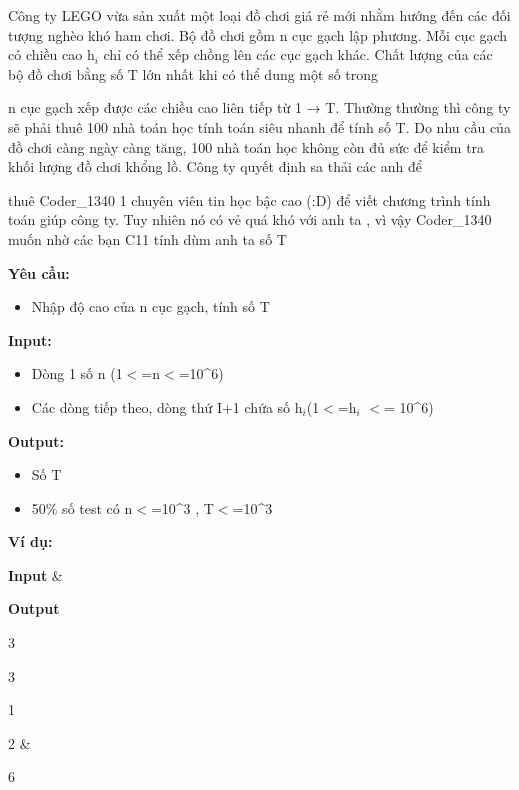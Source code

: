

Công ty LEGO vừa sản xuất một loại đồ chơi giá rẻ mới nhằm hướng đến các đối tượng nghèo khó ham chơi. Bộ đồ chơi gồm n cục gạch lập phương. Mỗi cục gạch có chiều cao h$_i$ chỉ có thể xếp chồng lên các cục gạch khác. Chất lượng của các bộ đồ chơi bằng số T lớn nhất khi có thể dung một số trong

n cục gạch xếp được các chiều cao liên tiếp từ 1 → T. Thường thường thì công ty sẽ phải thuê 100 nhà toán học tính toán siêu nhanh để tính số T. Do nhu cầu của đồ chơi càng ngày càng tăng, 100 nhà toán học không còn đủ sức để kiểm tra khối lượng đồ chơi khổng lồ. Công ty quyết định sa thải các anh để

thuê Coder\_1340 1 chuyên viên tin học bậc cao (:D) để viết chương trình tính toán giúp công ty. Tuy nhiên nó có vẻ quá khó với anh ta , vì vậy Coder\_1340 muốn nhờ các bạn C11 tính dùm anh ta số T

\textbf{Yêu cầu:}
\begin{itemize}
	\item 

Nhập độ  cao của n cục gạch, tính số T
\end{itemize}

\textbf{Input:}
\begin{itemize}
	\item 

Dòng 1 số  n (1$<$=n$<$=10\textasciicircum6)
	\item 

Các dòng  tiếp theo, dòng thứ I+1 chứa số h$_i $(1$<$=h$_i$ $<$= 10\textasciicircum6)
\end{itemize}

\textbf{Output:}
\begin{itemize}
	\item 

Số T
	\item 

50\% số test  có n$<$=10\textasciicircum3 , T$<$=10\textasciicircum3
\end{itemize}

\textbf{Ví dụ:}
\begin{tabular}\hline 


\textbf{Input} & 

\textbf{Output}  
\hline


3

3

1

2 & 

6  
\hline

\end{tabular}

